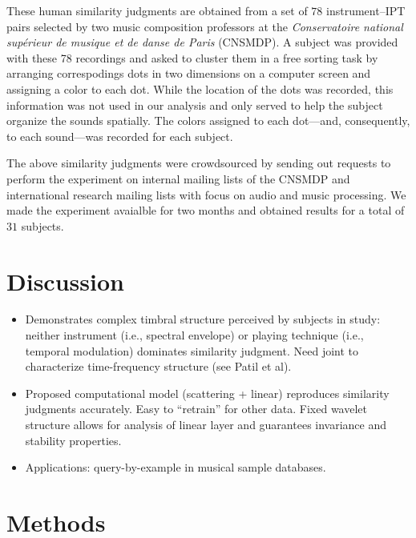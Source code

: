 \documentclass{article}
\begin{document}
These human similarity judgments are obtained from a set of $78$ instrument--IPT pairs selected by two music composition professors at the \emph{Conservatoire national sup\'erieur de musique et de danse de Paris} (CNSMDP).
A subject was provided with these 78 recordings and asked to cluster them in a free sorting task by arranging correspodings dots in two dimensions on a computer screen and assigning a color to each dot.
While the location of the dots was recorded, this information was not used in our analysis and only served to help the subject organize the sounds spatially.
The colors assigned to each dot---and, consequently, to each sound---was recorded for each subject.

The above similarity judgments were crowdsourced by sending out requests to perform the experiment on internal mailing lists of the CNSMDP and international research mailing lists with focus on audio and music processing.
We made the experiment avaialble for two months and obtained results for a total of $31$ subjects.


\section{Discussion}
\label{sec:discussion}

\begin{itemize}
\item Demonstrates complex timbral structure perceived by subjects in study: neither instrument (i.e., spectral envelope) or playing technique (i.e., temporal modulation) dominates similarity judgment. Need joint to characterize time-frequency structure (see Patil et al).
\item Proposed computational model (scattering + linear) reproduces similarity judgments accurately. Easy to ``retrain'' for other data. Fixed wavelet structure allows for analysis of linear layer and guarantees invariance and stability properties.
\item Applications: query-by-example in musical sample databases.
\end{itemize}

\section{Methods}
\label{sec:methods}
\end{document}
